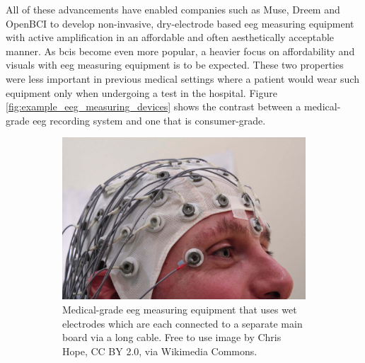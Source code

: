 All of these advancements have enabled companies such as Muse, Dreem and OpenBCI to develop non-invasive, dry-electrode based \gls{eeg} measuring equipment with active amplification in an affordable and often aesthetically acceptable manner.
As \glspl{bci} become even more popular, a heavier focus on affordability and visuals with \gls{eeg} measuring equipment is to be expected.
These two properties were less important in previous medical settings where a patient would wear such equipment only when undergoing a test in the hospital.
Figure \ref{fig:example_eeg_measuring_devices} shows the contrast between a medical-grade \gls{eeg} recording system and one that is consumer-grade.

\begin{figure}[ht]
  \begin{minipage}{\textwidth}
    \centering
    \begin{subfigure}{.48\textwidth}
        \centering
        \includegraphics[width=\textwidth]{../images/introduction/wet_eeg.jpg}
        \captionsetup{width=0.9\linewidth}
        \captionsetup{justification=centering}
        \caption{Medical-grade \gls{eeg} measuring equipment that uses wet electrodes which are each connected to a separate main board via a long cable. Free to use image by Chris Hope, CC BY 2.0, via Wikimedia Commons.\\ \hfill}
        \label{fig:example_eeg_measuring_devices_medical_bulky}
    \end{subfigure}
    \hfill
    \begin{subfigure}{.48\textwidth}
        \centering

\end{subfigure}
\end{minipage}
\end{figure}
